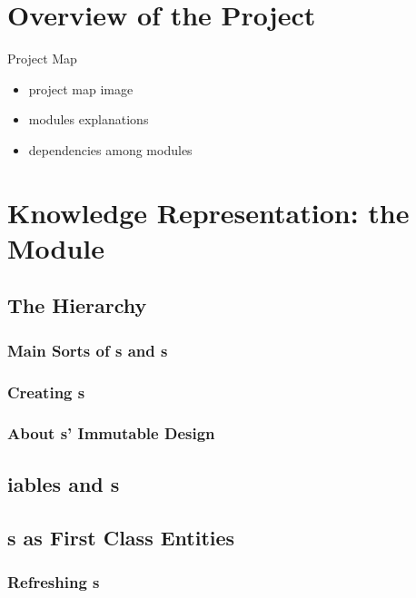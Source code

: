 \documentclass[presentation]{beamer}
\begin{document}
\section{Overview of the Project}

\begin{frame}{Project Map}
    \begin{itemize}
        \item project map image
        \item modules explanations
        \item dependencies among modules
    \end{itemize}
\end{frame}

\section{Knowledge Representation: the  Module}

\subsection{The  Hierarchy}

\subsubsection{Main Sorts of s and s}

\subsubsection{Creating s}

\subsubsection{About s' Immutable Design}

\subsection{iables and s}

\subsection{s as First Class Entities}

\subsubsection{Refreshing s}
\end{document}

